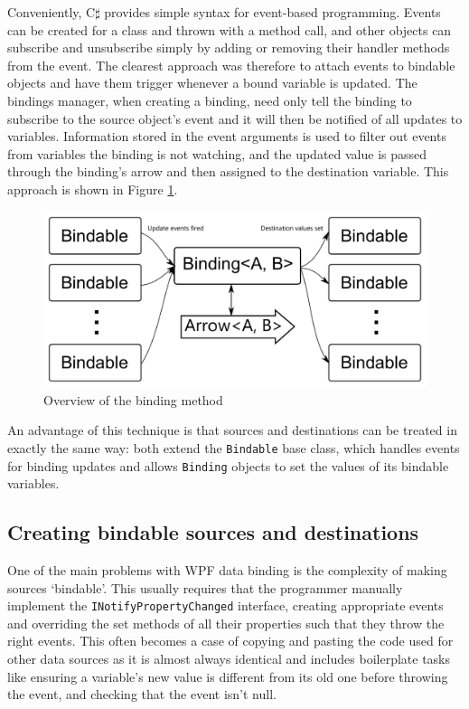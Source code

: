 \documentclass[12pt,twoside,notitlepage]{report}
\begin{document}
Conveniently, C$\sharp$ provides simple syntax for event-based programming. Events can be created for a class and thrown with a method call, and other objects can subscribe and unsubscribe simply by adding or removing their handler methods from the event. The clearest approach was therefore to attach events to bindable objects and have them trigger whenever a bound variable is updated. The bindings manager, when creating a binding, need only tell the binding to subscribe to the source object's event and it will then be notified of all updates to variables. Information stored in the event arguments is used to filter out events from variables the binding is not watching, and the updated value is passed through the binding's arrow and then assigned to the destination variable. This approach is shown in Figure \ref{fig:binding_framework}.

\begin{figure}[!ht]
  \centering
  \includegraphics[width=\textwidth]{fig/BindingFramework.pdf}
  \caption{Overview of the binding method}
  \label{fig:binding_framework}
\end{figure}

An advantage of this technique is that sources and destinations can be treated in exactly the same way: both extend the \texttt{Bindable} base class, which handles events for binding updates and allows \texttt{Binding} objects to set the values of its bindable variables.

\subsection{Creating bindable sources and destinations}

One of the main problems with WPF data binding is the complexity of making sources `bindable'. This usually requires that the programmer manually implement the \texttt{INotifyPropertyChanged} interface, creating appropriate events and overriding the set methods of all their properties such that they throw the right events. This often becomes a case of copying and pasting the code used for other data sources as it is almost always identical and includes boilerplate tasks like ensuring a variable's new value is different from its old one before throwing the event, and checking that the event isn't null.
\end{document}
